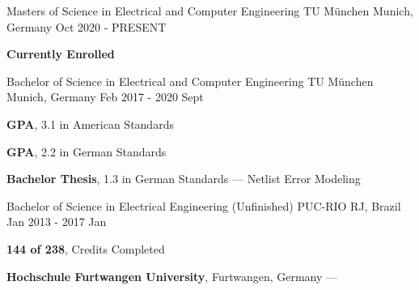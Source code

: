 
\begin{cventries}
  \cventry
    {Masters of Science in Electrical and Computer Engineering} %
    {TU München} %
    {Munich, Germany} %
    {Oct 2020 - PRESENT} %
    {
      \begin{cvitems} %
      \item {\textbf{Currently Enrolled}}
      \end{cvitems}
    }

  \cventry
    {Bachelor of Science in Electrical and Computer Engineering} %
    {TU München} %
    {Munich, Germany} %
    {Feb 2017 - 2020 Sept} %
    {
      \begin{cvitems} %
      \item {\textbf{GPA}, 3.1 in American Standards}
         \vspace{0.5mm}
         \item {\textbf{GPA}, 2.2 in German Standards}
         \vspace{0.5mm}
         \item {\textbf{Bachelor Thesis}, 1.3 in German Standards --- Netlist Error Modeling}
      \end{cvitems}
    }

  \cventry
    {Bachelor of Science in Electrical Engineering (Unfinished)} %
    {PUC-RIO} %
    {RJ, Brazil} %
    {Jan 2013 - 2017 Jan} %
    {
      \begin{cvitems} %
        \item {\textbf{144 of 238}, Credits Completed}
        \vspace{0.5mm}
        \item {\textbf{Hochschule Furtwangen University}, Furtwangen, Germany --- }
      \end{cvitems}
    }
\end{cventries}
